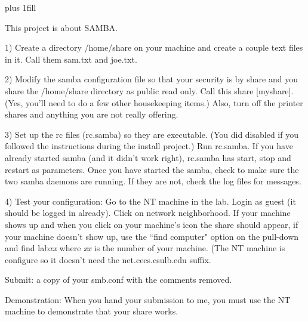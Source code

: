 
\rightskip=0pt plus 1fill

\parindent 0pt

This project is about SAMBA.

1) Create a directory {\ltt{}/home/share} on your machine and
create a couple text files in it. Call them {\ltt{}sam.txt} and 
{\ltt{}joe.txt}.

2) Modify the samba configuration file so that your security is by
share and you share the {\ltt{}/home/share} directory as public
read only. Call this share {\ltt{}[myshare]}. (Yes, you'll need
to do a few other housekeeping items.)
Also, turn off the printer shares and anything you are not really
offering.

3) Set up the rc files ({\ltt{}rc.samba}) so they are executable.
(You did disabled if you followed the instructions during the install
project.) Run {\ltt{}rc.samba}.
If you have already started samba (and it didn't work right), 
{\ltt{}rc.samba} has start, stop and restart as parameters.
Once you have started the samba,
check to make sure the two samba daemons are running.
If they are not, check the log files for messages.

4) Test your configuration: Go to the NT machine in the lab.
Login as guest (it should be logged in already). Click on network 
neighborhood. If your machine shows up and when you click on
your machine's icon the share should appear, if your
machine doesn't show up, use the ``find computer" option on the pull-down
and find {\ltt{}lab}{\it{}xx} where {\it xx} is the number of your machine.
(The NT machine is configure so it doesn't need the {\ltt{}net.cecs.csulb.edu}
suffix.

Submit: a copy of your smb.conf with the comments removed.

Demonstration: When you hand your submission to me, you must use the NT machine
to demonstrate that your share works.
\bye
